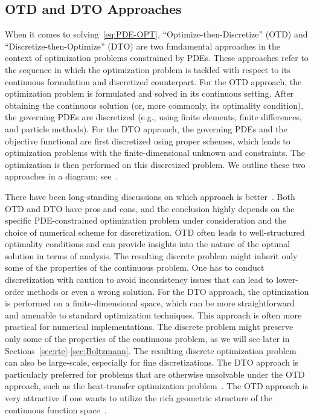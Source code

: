 \documentclass[12pt]{amsart}
\begin{document}
\subsection{OTD and DTO Approaches}\label{subsec:OTD_DTO}
When it comes to solving~\eqref{eq:PDE-OPT},
``Optimize-then-Discretize'' (OTD) and ``Discretize-then-Optimize'' (DTO) are two fundamental approaches in the context of optimization problems constrained by PDEs. These approaches refer to the sequence in which the optimization problem is tackled with respect to its continuous formulation and discretized counterpart. For the OTD approach, the optimization problem is formulated and solved in its continuous setting. After obtaining the continuous solution (or, more commonly, its optimality condition), the governing PDEs are discretized (e.g., using finite elements, finite differences, and particle methods). For the DTO approach, the governing PDEs and the objective functional are first discretized using proper schemes, which leads to optimization problems with the finite-dimensional unknown and constraints. The optimization is then performed on this discretized problem. We outline these two approaches in a diagram; see~.

There have been long-standing discussions on which approach is better~\cite{hinze2012discretization}. Both OTD and DTO have pros and cons, and the conclusion highly depends on the specific PDE-constrained optimization problem under consideration and the choice of numerical scheme for discretization. OTD often leads to well-structured optimality conditions and can provide insights into the nature of the optimal solution in terms of analysis. The resulting discrete problem might inherit only some of the properties of the continuous problem. One has to conduct discretization with caution to avoid inconsistency issues that can lead to lower-order methods or even a wrong solution. For the DTO approach,  the optimization is performed on a finite-dimensional space, which can be more straightforward and amenable to standard optimization techniques. This approach is often more practical for numerical implementations. The discrete problem might preserve only some of the properties of the continuous problem, as we will see later in Sections~\ref{sec:rte}-\ref{sec:Boltzmann}. The resulting discrete optimization problem can also be large-scale, especially for fine discretizations. The DTO approach is particularly preferred for problems that are otherwise unsolvable under the OTD approach, such as the heat-transfer optimization problem~\cite{betts2005discretize,ghobadi2009discretize}. The OTD approach is very attractive if one wants to utilize the rich geometric structure of the continuous function space~\cite{jacobs2019solving}.
\end{document}
